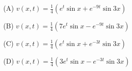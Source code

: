 \begin{enumerate}
    \item[(A)] \( v(x,t) = \frac{1}{4} \left( e^t \sin x + e^{-9t} \sin 3x \right) \)
    \item[(B)] \( v(x,t) = \frac{1}{4} \left( 7 e^t \sin x - e^{-9t} \sin 3x \right) \)
    \item[(C)] \( v(x,t) = \frac{1}{4} \left( e^t \sin x + e^{-3t} \sin 3x \right) \)
    \item[(D)] \( v(x,t) = \frac{1}{4} \left( 3 e^t \sin x - e^{-3t} \sin 3x \right) \)
\end{enumerate}
